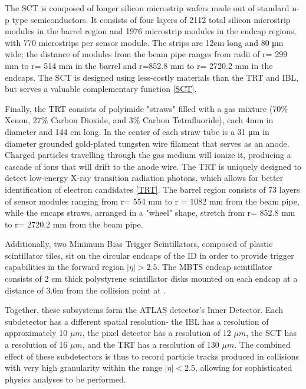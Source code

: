 The SCT is composed of longer silicon microstrip wafers made out of standard n-p type semiconductors. It consists of four layers of 2112 total silicon microstrip modules in the barrel region and 1976 microstrip modules in the endcap regions, with 770 microstrips per sensor module. The strips are 12cm long and 80 μm wide; the distance of modules from the beam pipe ranges from radii of r= 299 mm to r= 514 mm in the barrel and r=852.8 mm to r= 2720.2 mm in the endcaps. The SCT is designed using less-costly materials than the TRT and IBL, but serves a valuable complementary function \ref{SCT}.

Finally, the TRT consists of polyimide "straws" filled with a gas mixture (70\% Xenon, 27\% Carbon Dioxide, and 3\% Carbon Tetrafluoride), each 4mm in diameter and 144 cm long. In the center of each straw tube is a 31 μm in diameter grounded gold-plated tungsten wire filament that serves as an anode. Charged particles travelling through the gas medium will ionize it, producing a cascade of ions that will drift to the anode wire. The TRT is uniquely designed to detect low-energy X-ray transition radiation photons, which allows for better identification of electron candidates \ref{TRT}. The barrel region consists of 73 layers of sensor modules ranging from r= 554 mm to r = 1082 mm from the beam pipe, while the encaps straws, arranged in a "wheel" shape, stretch from r= 852.8 mm to r= 2720.2 mm from the beam pipe. 

Additionally, two Minimum Bias Trigger Scintillators, composed of plastic scintillator tiles, sit on the circular endcaps of the ID in order to provide trigger capabilities in the forward region $ |\eta| > 2.5 $. The MBTS endcap scintillator consists of 2 cm thick polystyrene scintillator disks mounted on each endcap at a distance of 3.6m from the collision point at . 

Together, these subsystems form the ATLAS detector's Inner Detector. Each subdetector has a different spatial resolution- the IBL has a resolution of  approximately 10 $\mu m$, the pixel detector has a resolution of 12 $\mu m$, the SCT has a resolution of 16 $\mu m$, and the TRT has a resolution of 130 $\mu m$. The combined effect of these subdetectors is thus to record particle tracks produced in collisions with very high granularity within the range $ | \eta | < 2.5$, allowing for sophisticated physics analyses to be performed. 

